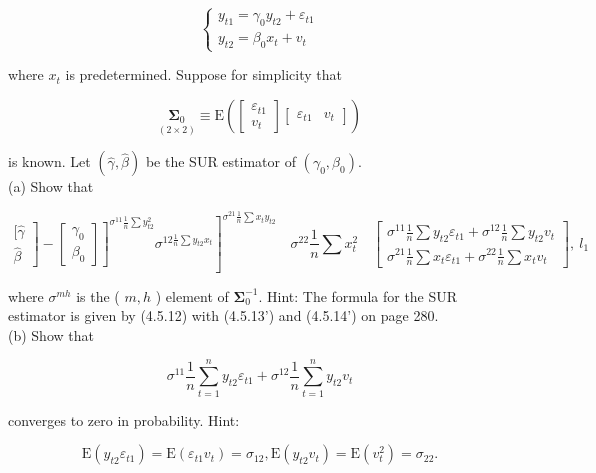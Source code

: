 \documentclass[10pt]{article}
\begin{document}
$$
\left\{\begin{array}{l}
y_{t 1}=\gamma_{0} y_{t 2}+\varepsilon_{t 1} \\
y_{t 2}=\beta_{0} x_{t}+v_{t}
\end{array}\right.
$$

where $x_{t}$ is predetermined. Suppose for simplicity that

$$
\underset{(2 \times 2)}{\boldsymbol{\Sigma}_{0}} \equiv \mathrm{E}\left(\left[\begin{array}{c}
\varepsilon_{t 1} \\
v_{t}
\end{array}\right]\left[\begin{array}{ll}
\varepsilon_{t 1} & v_{t}
\end{array}\right]\right)
$$

is known. Let $(\hat{\gamma}, \widehat{\beta})$ be the SUR estimator of $\left(\gamma_{0}, \beta_{0}\right)$.\\
(a) Show that

$$
\left.\left.\left.\begin{array}{l}
{[\hat{\gamma}} \\
\hat{\beta}
\end{array}\right]-\left[\begin{array}{l}
\gamma_{0} \\
\beta_{0}
\end{array}\right]\right]^{\sigma^{11} \frac{1}{n} \sum y_{t 2}^{2}} \sigma^{12 \frac{1}{n} \sum y_{t 2} x_{t}}\right]^{\sigma^{21} \frac{1}{n} \sum x_{t} y_{t 2}} \quad \sigma^{22} \frac{1}{n} \sum x_{t}^{2} \quad\left[\begin{array}{c}
\sigma^{11} \frac{1}{n} \sum y_{t 2} \varepsilon_{t 1}+\sigma^{12} \frac{1}{n} \sum y_{t 2} v_{t} \\
\sigma^{21} \frac{1}{n} \sum x_{t} \varepsilon_{t 1}+\sigma^{22} \frac{1}{n} \sum x_{t} v_{t}
\end{array}\right], ~ l_{1}
$$

where $\sigma^{m h}$ is the ( $m, h$ ) element of $\boldsymbol{\Sigma}_{0}^{-1}$. Hint: The formula for the SUR estimator is given by (4.5.12) with (4.5.13') and (4.5.14') on page 280.\\
(b) Show that

$$
\sigma^{11} \frac{1}{n} \sum_{t=1}^{n} y_{t 2} \varepsilon_{t 1}+\sigma^{12} \frac{1}{n} \sum_{t=1}^{n} y_{t 2} v_{t}
$$

converges to zero in probability. Hint:

$$
\mathrm{E}\left(y_{t 2} \varepsilon_{t 1}\right)=\mathrm{E}\left(\varepsilon_{t 1} v_{t}\right)=\sigma_{12}, \mathrm{E}\left(y_{t 2} v_{t}\right)=\mathrm{E}\left(v_{t}^{2}\right)=\sigma_{22} .
$$
\end{document}
